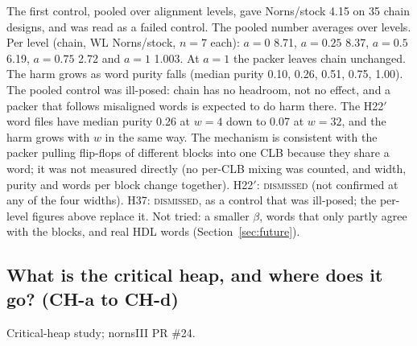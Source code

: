 The first control, pooled over alignment levels, gave Norns/stock 4.15 on 35 chain designs, and was read as a failed control. The pooled number averages over levels. Per level (chain, WL Norns/stock, $n=7$ each): $a=0$ 8.71, $a=0.25$ 8.37, $a=0.5$ 6.19, $a=0.75$ 2.72 and $a=1$ 1.003. %
At $a=1$ the packer leaves chain unchanged. The harm grows as word purity falls (median purity 0.10, 0.26, 0.51, 0.75, 1.00). The pooled control was ill-posed: chain has no headroom, not no effect, and a packer that follows misaligned words is expected to do harm there. The H22$'$ word files have median purity 0.26 at $w=4$ down to 0.07 at $w=32$, and the harm grows with $w$ in the same way. The mechanism is consistent with the packer pulling flip-flops of different blocks into one CLB because they share a word; it was not measured directly (no per-CLB mixing was counted, and width, purity and words per block change together).
 H22$'$: \textsc{dismissed} (not confirmed at any of the four widths). H37: \textsc{dismissed}, as a control that was ill-posed; the per-level figures above replace it. Not tried: a smaller $\beta$, words that only partly agree with the blocks, and real HDL words (Section~\ref{sec:future}).

\subsection{What is the critical heap, and where does it go? (CH-a to CH-d)}
\label{sec:e-heap}

 Critical-heap study; nornsIII PR \#24.

